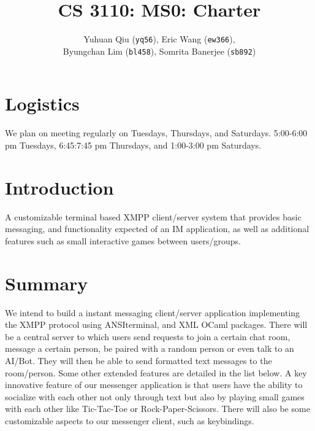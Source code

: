 \documentclass[a4paper]{article}
\title{
    \vspace{-4.0cm}
	CS 3110: MS0: Charter
}
\author{
	Yuhuan Qiu (\texttt{yq56}),
	Eric Wang (\texttt{ew366}),
    \\Byungchan Lim (\texttt{bl458}),
	Somrita Banerjee (\texttt{sb892})
}
\begin{document}
\maketitle

\section{Logistics}

We plan on meeting regularly on Tuesdays, Thursdays, and Saturdays.
5:00-6:00 pm Tuesdays,
6:45:7:45 pm Thursdays, and
1:00-3:00 pm Saturdays.

\section{Introduction}

A customizable terminal based XMPP client/server system that provides basic
messaging, and functionality expected of an IM application, as well as additional
features such as small interactive games between users/groups.

\section{Summary}

We intend to build a instant messaging client/server application implementing
the XMPP protocol using ANSIterminal, and XML OCaml packages. There will be a
central server to which users send requests to join a certain chat room, message
a certain person, be paired with a random person or even talk to an AI/Bot. They
will then be able to send formatted text messages to the room/person. Some other
extended features are detailed in the list below. A key innovative feature of
our messenger application is that users have the ability to socialize with each
other not only through text but also by playing small games with each other like
Tic-Tac-Toe or Rock-Paper-Scissors. There will also be some customizable aspects
to our messenger client, such as keybindings.
\end{document}

